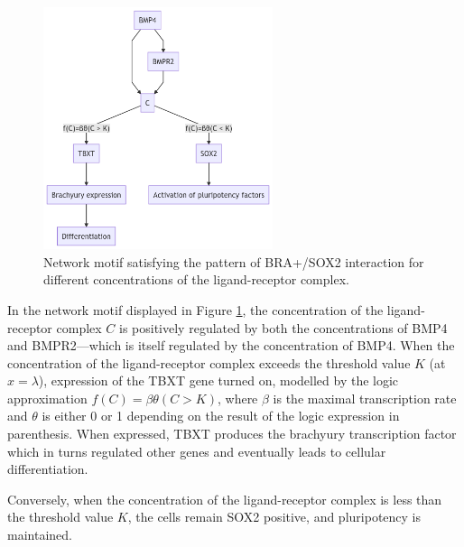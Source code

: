 \documentclass{article} %
\begin{document}
\begin{enumerate}
    \FloatBarrier
    \begin{figure}[h]
      \centering
      \includegraphics[width=0.6\textwidth]{motif}
      \caption{Network motif satisfying the pattern of BRA+/SOX2 interaction for different concentrations of the ligand-receptor complex.}
      \label{fig:motif}
    \end{figure} 
    \FloatBarrier

    In the network motif displayed in Figure \ref{fig:motif}, the concentration of the ligand-receptor complex $C$ is positively regulated by both the concentrations of BMP4 and BMPR2---which is itself regulated by the concentration of BMP4. When the concentration of the ligand-receptor complex exceeds the threshold value $K$ (at $x=\lambda$), expression of the TBXT gene turned on, modelled by the logic approximation $f(C)=\beta \theta (C > K)$, where $\beta$ is the maximal transcription rate and $\theta$ is either 0 or 1 depending on the result of the logic expression in parenthesis. When expressed, TBXT produces the brachyury transcription factor which in turns regulated other genes and eventually leads to cellular differentiation.

    Conversely, when the concentration of the ligand-receptor complex is less than the threshold value $K$, the cells remain SOX2 positive, and pluripotency is maintained.


\end{enumerate}
\end{document}
